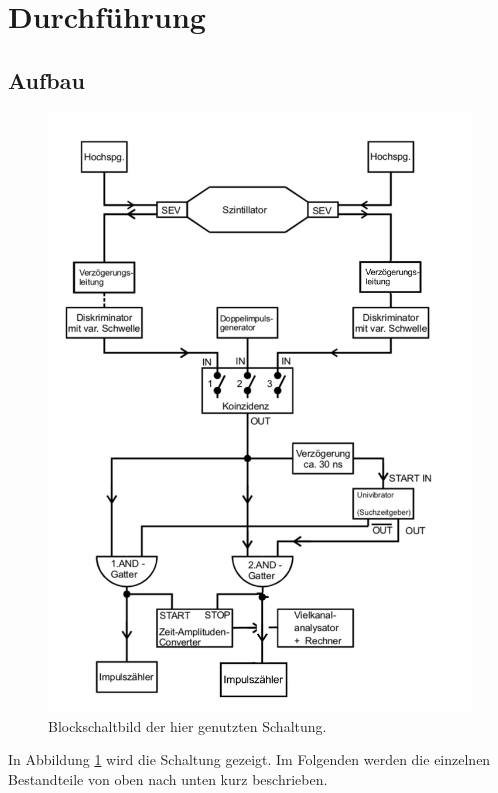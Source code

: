  \section{Durchführung}
\label{sec:Durchführung}
\subsection{Aufbau}
\begin{figure}
  \centering
  \includegraphics[width=\textwidth]{leuteBeimKacken/Schaltung.pdf}
  \caption{Blockschaltbild der hier genutzten Schaltung.\cite{anleitung}}
  \label{fig:Schaltung}
\end{figure}

In Abbildung \ref{fig:Schaltung} wird die Schaltung gezeigt. Im Folgenden werden die einzelnen Bestandteile von oben nach unten kurz beschrieben.

